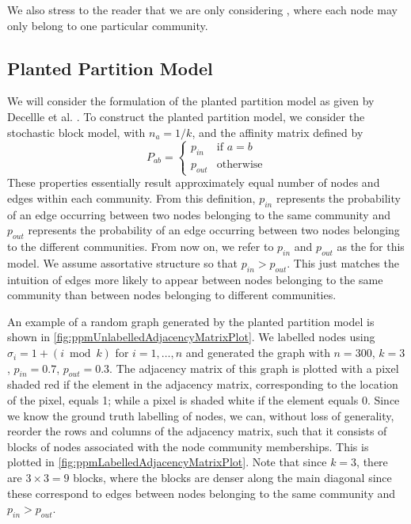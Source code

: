 We also stress to the reader that we are only considering , where each node may only belong to one particular community.


\subsection{Planted Partition Model}
\label{subsec:plantedPartitionModel}

We will consider the formulation of the planted partition model as given by Decellle et al. \cite{DKM+13}.
To construct the planted partition model, we consider the stochastic block model, with $n_{a} = 1/k$, and the affinity matrix defined by
\begin{equation}
	\label{def:ppmAffinityMatrix}
	P_{ab} =
	\begin{cases}
		p_{in} & \text{if } a = b\\
		p_{out} & \text{otherwise}
	\end{cases}
\end{equation}
These properties essentially result approximately equal number of nodes and edges within each community.
From this definition, $p_{in}$ represents the probability of an edge occurring between two nodes belonging to the same community and $p_{out}$ represents the probability of an edge occurring between two nodes belonging to the different communities.
From now on, we refer to $p_{in}$ and $p_{out}$ as the  for this model.
We assume assortative structure so that $p_{in} > p_{out}$. This just matches the intuition of edges more likely to appear between nodes belonging to the same community than between nodes belonging to different communities.

An example of a random graph generated by the planted partition model is shown in \cref{fig:ppmUnlabelledAdjacencyMatrixPlot}.
We labelled nodes using $\sigma_{i} = 1 + (i \bmod{k})$ for $i = 1,\dots,n$ and generated the graph with $n = 300$, $k = 3$, $p_{in} = 0.7$, $p_{out} = 0.3$.
The adjacency matrix of this graph is plotted with a pixel shaded red if the element in the adjacency matrix, corresponding to the location of the pixel, equals 1; while a pixel is shaded white if the element equals 0.
Since we know the ground truth labelling of nodes, we can, without loss of generality, reorder the rows and columns of the adjacency matrix, such that it consists of blocks of nodes associated with the node community memberships.
This is plotted in \cref{fig:ppmLabelledAdjacencyMatrixPlot}. Note that since $k = 3$, there are $3 \times 3 = 9$ blocks, where the blocks are denser along the main diagonal since these correspond to edges between nodes belonging to the same community and $p_{in} > p_{out}$.

